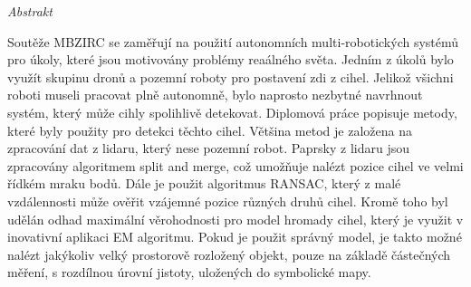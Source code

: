 \vfill
\begin{center}
{\it \large Abstrakt}
\vspace{0.2cm}

\begin{minipage}{0.8\textwidth}{
Soutěže MBZIRC se zaměřují na použití autonomních multi-robotických systémů pro úkoly, které jsou motivovány problémy reaálného světa. Jedním z úkolů bylo využít skupinu dronů a pozemní roboty pro postavení zdi z cihel. Jelikož všichni roboti museli pracovat plně autonomně, bylo naprosto nezbytné navrhnout systém, který může cihly spolihlivě detekovat. Diplomová práce popisuje metody, které byly použity pro detekci těchto cihel. Většina metod je založena na zpracování dat z lidaru, který nese pozemní robot. Paprsky z lidaru jsou zpracovány algoritmem split and merge, což umožňuje nalézt pozice cihel ve velmi řídkém mraku bodů. Dále je použit algoritmus RANSAC, který z malé vzdálennosti může ověřit vzájemné pozice různých druhů cihel. Kromě toho byl udělán odhad maximální věrohodnosti pro model hromady cihel, který je využit v inovativní aplikaci EM algoritmu. Pokud je použit správný model, je takto možné nalézt jakýkoliv velký prostorově rozložený objekt, pouze na základě částečných měření, s rozdílnou úrovní jistoty, uložených do symbolické mapy.

}
\end{minipage}
\end{center}
\vfill
\vspace{1cm}
\newpage{}
